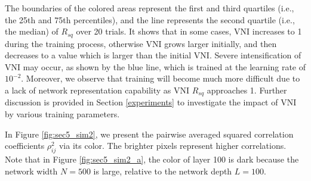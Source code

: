 The boundaries of the colored areas represent the first and third quartiles (i.e., the 25th and 75th
percentiles), and the line represents the second quartile (i.e., the median) of $R_{sq}$ over 20 trials.
% 
% 
It shows that in some cases, VNI increases to 1 during the training process, otherwise VNI grows larger
initially, and then decreases to a value which is larger than the initial VNI.
Severe intensification of VNI may occur, as shown by the blue line, which is trained at the learning rate
of $10^{-2} $. 
Moreover, we observe that training will become much more difficult due to a lack of network representation
capability as VNI $R_{sq}$ approaches 1.
Further discussion is provided in Section \ref{experiments} to investigate the impact of VNI by various
training parameters.

In Figure \ref{fig:sec5_sim2}, we present the pairwise averaged squared correlation coefficients
$\rho_{ij}^2$ via its color. The brighter pixels represent higher correlations.
Note that in Figure \ref{fig:sec5_sim2_a}, the color of layer 100 is dark because the network width
$N=500$ is large, relative to the network depth $L=100$.





